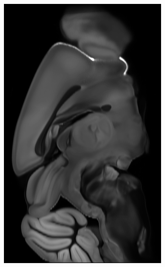 \documentclass[]{article}
\begin{document}
\begin{figure}
\begin{subfigure}{0.3\textwidth}
		\includegraphics[width=.67\linewidth, angle=270]{figures/avgt_sagittal.png}
		\caption{}
	\end{subfigure}\\


\end{figure}
\end{document}
